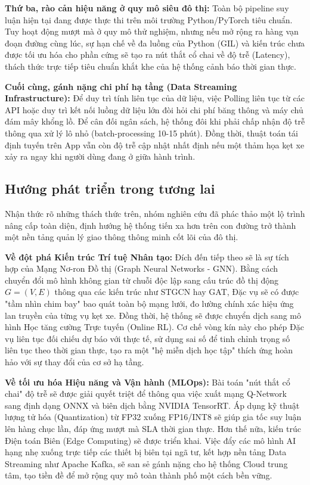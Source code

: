 \textbf{Thứ ba, rào cản hiệu năng ở quy mô siêu đô thị:} Toàn bộ pipeline suy luận hiện tại đang được thực thi trên môi trường Python/PyTorch tiêu chuẩn. Tuy hoạt động mượt mà ở quy mô thử nghiệm, nhưng nếu mở rộng ra hàng vạn đoạn đường cùng lúc, sự hạn chế về đa luồng của Python (GIL) và kiến trúc chưa được tối ưu hóa cho phần cứng sẽ tạo ra nút thắt cổ chai về độ trễ (Latency), thách thức trực tiếp tiêu chuẩn khắt khe của hệ thống cảnh báo thời gian thực.

\textbf{Cuối cùng, gánh nặng chi phí hạ tầng (Data Streaming Infrastructure):} Để duy trì tính liên tục của dữ liệu, việc Polling liên tục từ các API hoặc duy trì kết nối luồng dữ liệu lớn đòi hỏi chi phí băng thông và máy chủ đám mây khổng lồ. Để cân đối ngân sách, hệ thống đôi khi phải chấp nhận độ trễ thông qua xử lý lô nhỏ (batch-processing 10-15 phút). Đồng thời, thuật toán tái định tuyến trên App vẫn còn độ trễ cập nhật nhất định nếu một thảm họa kẹt xe xảy ra ngay khi người dùng đang ở giữa hành trình.

\subsection{Hướng phát triển trong tương lai}

Nhận thức rõ những thách thức trên, nhóm nghiên cứu đã phác thảo một lộ trình nâng cấp toàn diện, định hướng hệ thống tiến xa hơn trên con đường trở thành một nền tảng quản lý giao thông thông minh cốt lõi của đô thị.

\textbf{Về đột phá Kiến trúc Trí tuệ Nhân tạo:} Đích đến tiếp theo sẽ là sự tích hợp của Mạng Nơ-ron Đồ thị (Graph Neural Networks - GNN). Bằng cách chuyển đổi mô hình không gian từ chuỗi độc lập sang cấu trúc đồ thị động $G=(V, E)$ thông qua các kiến trúc như STGCN hay GAT, Đặc vụ sẽ có được "tầm nhìn chim bay" bao quát toàn bộ mạng lưới, đo lường chính xác hiệu ứng lan truyền của từng vụ kẹt xe. Đồng thời, hệ thống sẽ được chuyển dịch sang mô hình Học tăng cường Trực tuyến (Online RL). Cơ chế vòng kín này cho phép Đặc vụ liên tục đối chiếu dự báo với thực tế, sử dụng sai số để tinh chỉnh trọng số liên tục theo thời gian thực, tạo ra một "hệ miễn dịch học tập" thích ứng hoàn hảo với sự thay đổi của cơ sở hạ tầng.

\textbf{Về tối ưu hóa Hiệu năng và Vận hành (MLOps):} Bài toán "nút thắt cổ chai" độ trễ sẽ được giải quyết triệt để thông qua việc xuất mạng Q-Network sang định dạng ONNX và biên dịch bằng NVIDIA TensorRT. Áp dụng kỹ thuật lượng tử hóa (Quantization) từ FP32 xuống FP16/INT8 sẽ giúp gia tốc suy luận lên hàng chục lần, đáp ứng mượt mà SLA thời gian thực. Hơn thế nữa, kiến trúc Điện toán Biên (Edge Computing) sẽ được triển khai. Việc đẩy các mô hình AI hạng nhẹ xuống trực tiếp các thiết bị biên tại ngã tư, kết hợp nền tảng Data Streaming như Apache Kafka, sẽ san sẻ gánh nặng cho hệ thống Cloud trung tâm, tạo tiền đề để mở rộng quy mô toàn thành phố một cách bền vững.

